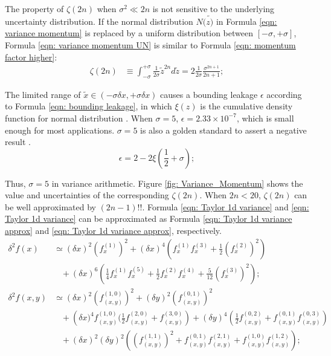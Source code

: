 \documentclass[twoside]{article}
\numberwithin{equation}{section}
\newcommand{\eqspace}{\;\;\;}
\begin{document}
The property of $\zeta(2n)$ when $\sigma^2 \ll 2n$ is not sensitive to the underlying uncertainty distribution.  If the normal distribution $N(\tilde{z)}$ in Formula \eqref{eqn: variance momentum} is replaced by a uniform distribution between $[-\sigma, +\sigma]$,  Formula \eqref{eqn: variance momentum UN} is similar to Formula \eqref{eqn: momentum factor higher}:
\begin{align}
\label{eqn: variance momentum UN}
\zeta(2n) &\equiv \int_{-\sigma}^{+\sigma} \frac{1}{2 \sigma} \tilde{z}^{2n} d \tilde{z} = 2 \frac{1}{2 \sigma} \frac{{\sigma}^{2n+1}}{2n + 1}; 
\end{align}

The limited range of $\tilde{x} \in (-\sigma \delta x, +\sigma \delta x)$ causes a bounding leakage $\epsilon$ according to Formula \eqref{eqn: bounding leakage}, in which $\xi(z)$ is the cumulative density function for normal distribution \cite{Probability_Statistics}.
When $\sigma = 5$, $\epsilon = 2.33 \times 10^{-7}$, which is small enough for most applications.
$\sigma = 5$ is also a golden standard to assert a negative result \cite{Precisions_Physical_Measurements}.
\begin{equation}
\label{eqn: bounding leakage}
\epsilon = 2 - 2 \xi(\frac{1}{2} + \sigma);
\end{equation}

Thus, $\sigma = 5$ in variance arithmetic.  
Figure \ref{fig: Variance_Momentum} shows the value and uncertainties of the corresponding $\zeta(2n)$.
When $2n < 20$, $\zeta(2n)$ can be well approximated by $(2n -1)!!$.  
Formula \eqref{eqn: Taylor 1d variance} and \eqref{eqn: Taylor 1d variance} can be approximated as Formula \eqref{eqn: Taylor 1d variance approx} and \eqref{eqn: Taylor 1d variance approx}, respectively.
\begin{align}
\label{eqn: Taylor 1d variance approx}
\delta^2 f(x) &\simeq (\delta x)^2 (f^{(1)}_x)^2 + (\delta x)^4 \left(f^{(1)}_x f^{(3)}_x + \frac{1}{2} (f^{(2)}_x)^2 \right) \\
  &\eqspace + (\delta x)^6 \left(\frac{1}{4} f^{(1)}_x f^{(5)}_x + \frac{1}{2} f^{(2)}_x f^{(4)}_x + \frac{5}{12} (f^{(3)}_x)^2 \right); \nonumber \\
\label{eqn: Taylor 2d variance approx}
\delta^2 f(x, y)&\simeq (\delta x)^2 (f^{(1,0)}_{(x,y)})^2 + (\delta y)^2 (f^{(0,1)}_{(x,y)})^2 \\
&\eqspace + \left(\delta x)^4 f^{(1,0)}_{(x,y)} (\frac{1}{2} f^{(2,0)}_{(x,y)} + f^{(3,0)}_{(x,y)}\right)
      + (\delta y)^4 \left(\frac{1}{2} f^{(0,2)}_{(x,y)} + f^{(0,1)}_{(x,y)} f^{(0,3)}_{(x,y)}\right) \nonumber \\
&\eqspace + (\delta x)^2 (\delta y)^2 \left((f^{(1,1)}_{(x,y)})^2 + f^{(0,1)}_{(x,y)} f^{(2,1)}_{(x,y)} + f^{(1,0)}_{(x,y)} f^{(1,2)}_{(x,y)}\right); \nonumber
\end{align}
\end{document}
